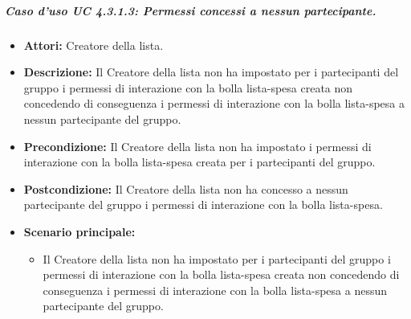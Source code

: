 \subparagraph{Caso d'uso UC 4.3.1.3: Permessi concessi a nessun partecipante.}
\label{Caso d'uso UC 4.3.1.3: Permessi concessi a nessun partecipante.}

\FloatBarrier
\begin{itemize}
\item \textbf{Attori:} Creatore della lista.
\item \textbf{Descrizione:} Il Creatore della lista non ha impostato per i partecipanti del gruppo i permessi di interazione con la bolla lista-spesa creata non concedendo di conseguenza i permessi di interazione con la bolla lista-spesa a nessun partecipante del gruppo.
\item \textbf{Precondizione:} Il Creatore della lista non ha impostato i permessi di interazione con la bolla lista-spesa creata per i partecipanti del gruppo.
\item \textbf{Postcondizione:} Il Creatore della lista non ha concesso a nessun partecipante del gruppo i permessi di interazione con la bolla lista-spesa.
\item \textbf{Scenario principale:}
\begin{itemize}
\item Il Creatore della lista non ha impostato per i partecipanti del gruppo i permessi di interazione con la bolla lista-spesa creata non concedendo di conseguenza i permessi di interazione con la bolla lista-spesa a nessun partecipante del gruppo.
\end{itemize}
\end{itemize}
